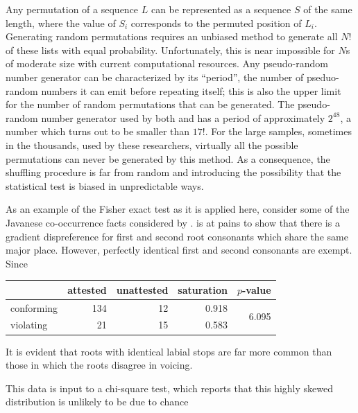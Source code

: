 Any permutation of a sequence $L$ can be represented as a sequence $S$ of the same length, where the value of $S_i$ corresponds to the permuted position of $L_i$. Generating random permutations requires an unbiased method to generate all $N!$ of these lists with equal probability. Unfortunately, this is near impossible for $N$s of moderate size with current computational resources. Any pseudo-random number generator can be characterized by its ``period'', the number of pseduo-random numbers it can emit before repeating itself; this is also the upper limit for the number of random permutations that can be generated. The pseudo-random number generator used by both \citeauthor{Martin2011} and \citeauthor{Brown2010} has a period of approximately $2^{48}$, a number which turns out to be smaller than $17!$. For the large samples, sometimes in the thousands, used by these researchers, virtually all the possible permutations can never be generated by this method. As a consequence, the shuffling procedure is far from random and introducing the possibility that the statistical test is biased in unpredictable ways.

As an example of the Fisher exact test as it is applied here, consider some of the Javanese co-occurrence facts considered by \citet{Mester1988}. \citeauthor{Mester1988} is at pains to show that there is a gradient dispreference for first and second root consonants which share the same major place. However, perfectly identical first and second consonants are exempt. Since 



\begin{example}[Javanese root co-occurrence] %
\begin{tabular}{l r r r r}
\toprule
           & attested & unattested & saturation & $p$-value \\
\midrule
conforming & 134      & 12         & 0.918      & \multirow{2}{*}{6.095\e{-06}} \\
violating  & 21       & 15         & 0.583 \\
\bottomrule
\end{tabular}
\end{example}

\noindent It is evident that roots with identical labial stops are far more common than those in which the roots disagree in voicing. 

This data is input to a chi-square test, which reports that this highly skewed distribution is unlikely to be due to chance 

